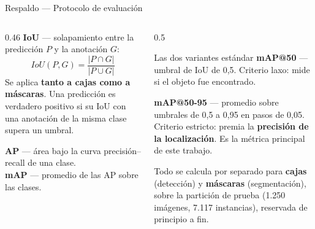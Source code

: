 \documentclass[aspectratio=169,11pt]{beamer}
\begin{document}
\begin{frame}{Respaldo --- Protocolo de evaluación}
  \begin{columns}[T]
    \begin{column}{0.46\textwidth}
      \textbf{IoU} --- solapamiento entre la predicción $P$ y la anotación $G$:
      \begin{equation*}
        IoU(P,G) = \frac{|P \cap G|}{|P \cup G|}
      \end{equation*}
      Se aplica \textbf{tanto a cajas como a máscaras}. Una predicción es verdadero
      positivo si su IoU con una anotación de la misma clase supera un umbral.
      \vspace{0.6em}

      \textbf{AP} --- área bajo la curva precisión--recall de una clase.\\
      \textbf{mAP} --- promedio de las AP sobre las clases.
    \end{column}
    \begin{column}{0.5\textwidth}
      \begin{block}{Las dos variantes estándar}
        \footnotesize
        \textbf{mAP@50} --- umbral de IoU de 0,5. Criterio laxo: mide si el objeto fue
        encontrado.
        \vspace{0.4em}

        \textbf{mAP@50-95} --- promedio sobre umbrales de 0,5 a 0,95 en pasos de 0,05.
        Criterio estricto: premia la \textbf{precisión de la localización}. Es la métrica
        principal de este trabajo.
      \end{block}
      \vspace{0.4em}
      {\footnotesize Todo se calcula por separado para \textbf{cajas} (detección) y
      \textbf{máscaras} (segmentación), sobre la partición de prueba
      (1.250 imágenes, 7.117 instancias), reservada de principio a fin.}
    \end{column}
  \end{columns}
\end{frame}
\end{document}
